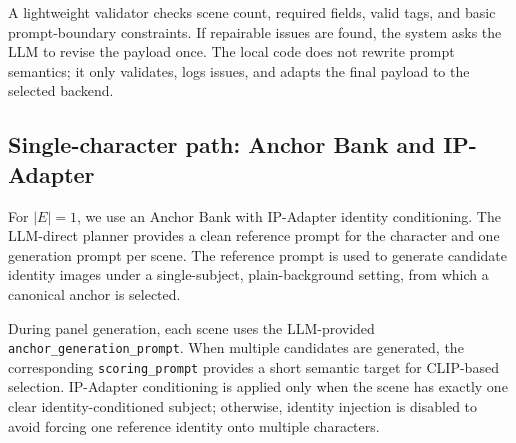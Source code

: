 A lightweight validator checks scene count, required fields, valid tags, and basic prompt-boundary constraints. If repairable issues are found, the system asks the LLM to revise the payload once. The local code does not rewrite prompt semantics; it only validates, logs issues, and adapts the final payload to the selected backend.


\subsection{Single-character path: Anchor Bank and IP-Adapter}
\label{sec:single}

For $|E|=1$, we use an Anchor Bank with IP-Adapter identity conditioning. The LLM-direct planner provides a clean reference prompt for the character and one generation prompt per scene. The reference prompt is used to generate candidate identity images under a single-subject, plain-background setting, from which a canonical anchor is selected.

During panel generation, each scene uses the LLM-provided \texttt{anchor\_generation\_prompt}. When multiple candidates are generated, the corresponding \texttt{scoring\_prompt} provides a short semantic target for CLIP-based selection. IP-Adapter conditioning is applied only when the scene has exactly one clear identity-conditioned subject; otherwise, identity injection is disabled to avoid forcing one reference identity onto multiple characters.





